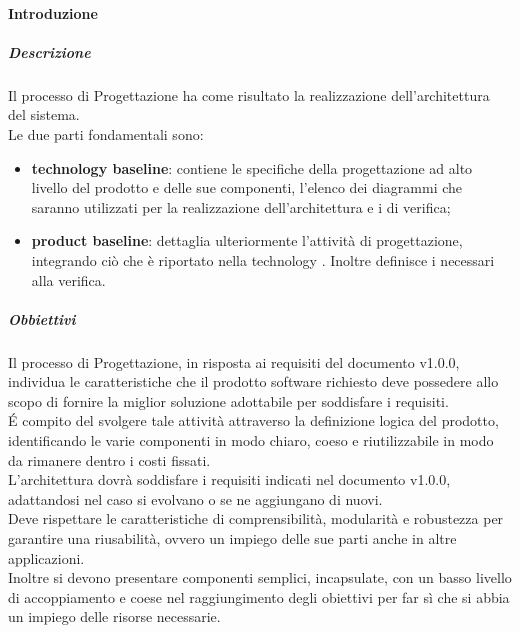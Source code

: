             \paragraph{Introduzione}
                \subparagraph{Descrizione}
                    Il processo di Progettazione ha come risultato la realizzazione dell’architettura del sistema.\\
                    Le due parti fondamentali sono:\\
                    \begin{itemize}
                        \item\textbf{technology baseline}: contiene le specifiche della progettazione ad alto livello del prodotto e delle sue componenti, l'elenco dei diagrammi  che saranno utilizzati per la realizzazione dell'architettura e i  di verifica;
                        \item\textbf{product baseline}: dettaglia ulteriormente l'attività di progettazione, integrando ciò che è riportato nella technology . Inoltre definisce i  necessari alla verifica.
                    \end{itemize}
                \subparagraph{Obbiettivi}
                    Il processo di Progettazione, in risposta ai requisiti del documento  v1.0.0, individua le caratteristiche che il prodotto software richiesto deve possedere allo scopo di fornire la miglior soluzione adottabile per soddisfare i requisiti.\\
                    É compito del  svolgere tale attività attraverso la definizione logica del prodotto, identificando le varie componenti in modo chiaro, coeso e riutilizzabile in modo da rimanere dentro i costi fissati.\\
                    L'architettura dovrà soddisfare i requisiti indicati nel documento  v1.0.0, adattandosi nel caso si evolvano o se ne aggiungano di nuovi. \\
                    Deve rispettare le caratteristiche di comprensibilità, modularità e robustezza per garantire una riusabilità, ovvero un impiego delle sue parti anche in altre applicazioni. \\
                    Inoltre si devono presentare componenti semplici, incapsulate, con un basso livello di accoppiamento e coese nel raggiungimento degli obiettivi per far sì che si abbia un impiego  delle risorse necessarie.\\
                    
